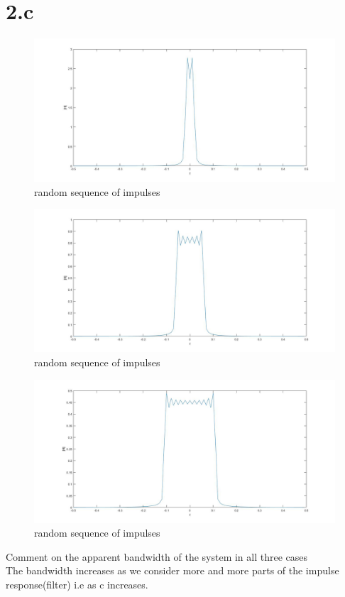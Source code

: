 \documentclass[a4paper,11pt]{article}
\begin{document}
\section*{2.c}
\begin{figure}[h]
  \hspace*{-5cm}
   \includegraphics[scale=0.45]{q2_c_1}
   \caption{random sequence of impulses}\label{fig:q3}
\end{figure}
\begin{figure}[h]
  \hspace*{-5cm}
   \includegraphics[scale=0.45]{q2_c_2}
   \caption{random sequence of impulses}\label{fig:q3}
\end{figure}
\begin{figure}[h]
  \hspace*{-5cm}
   \includegraphics[scale=0.45]{q2_c_3}
   \caption{random sequence of impulses}\label{fig:q3}
\end{figure}
Comment on the apparent bandwidth of the system in all three cases\\
The bandwidth increases as we consider more and more parts of the impulse response(filter) i.e as c increases.
\clearpage
\newpage
\end{document}
